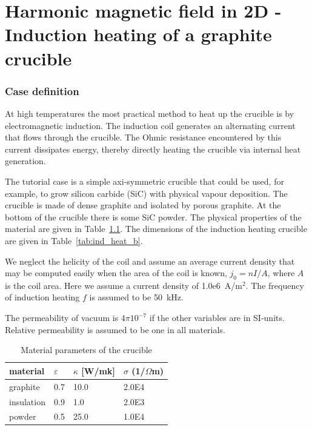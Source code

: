 \chapter{Harmonic magnetic field in 2D - Induction heating of a graphite crucible}



\subsection*{Case definition}

At high temperatures the most practical 
method to heat up the crucible 
is by electromagnetic induction. 
The induction coil generates an alternating 
current that flows through the crucible. 
The Ohmic resistance encountered by this current dissipates 
energy, thereby directly
heating the crucible via internal heat generation.

The tutorial case is a simple axi-symmetric crucible that could be
used, for example, to grow silicon carbide (SiC) with physical vapour deposition.
The crucible 
is made of dense graphite and isolated by 
porous graphite. At the bottom of the crucible there is
some SiC powder. The physical properties of the 
material are given in Table~\ref{tab:ind_heat_a}. The dimensions of the
induction heating crucible are given in Table~\ref{tab:ind_heat_b}.

We neglect the helicity of the coil and assume an  
average current density that may be computed easily when the 
area of the coil is known, $j_0=n I / A$, where $A$ is the coil area.
Here we assume a current density of 1.0e6~A/m$^2$. 
The frequency of induction heating $f$ is assumed to be 50~kHz.

The permeability of vacuum is $4\pi 10^{-7}$
if the other variables are in SI-units. Relative permeability is assumed to be one in all materials. 

\begin{table}
\caption{Material parameters of the crucible}
\label{tab:ind_heat_a}
\begin{center}
\begin{tabular}{llll} \hline
material & $\varepsilon$  & $\kappa$ [W/mk] & $\sigma$ (1/$\Omega$m) \\ \hline 
graphite  &      0.7   &          10.0  &          2.0E4 \\
insulation &      0.9   &          1.0   &          2.0E3  \\
powder    &      0.5   &          25.0  &          1.0E4 \\ \hline
\end{tabular}
\end{center}
\end{table}

